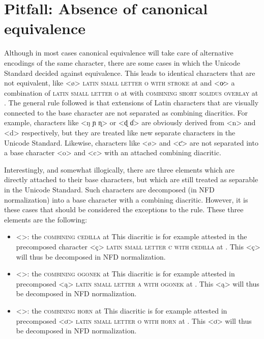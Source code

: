\section{Pitfall: Absence of canonical equivalence}
\label{pitfall-absence-of-equivalence}

Although in most cases canonical equivalence will take care of alternative
encodings of the same character, there are some cases in which the Unicode
Standard decided against equivalence. This leads to identical characters that
are not equivalent, like <ø> \textsc{latin small letter o with stroke} at
 and <o̷> a combination of \textsc{latin small letter o} at 
with \textsc{combining short solidus overlay} at .
The general rule followed is that extensions of Latin characters that are
visually connected to the base character are not separated as combining diacritics. For
example, characters like <ŋ ɲ ɳ> or <ɖ ɗ> are obviously derived from <n> and <d>
respectively, but they are treated like new separate characters in the Unicode
Standard. Likewise, characters like <ø> and <ƈ> are not separated into a base 
character <o> and <c> with an attached combining diacritic.

Interestingly, and somewhat illogically, there are three elements which are
directly attached to their base characters, but which are still treated as
separable in the Unicode Standard. Such characters are decomposed (in NFD
normalization) into a base character with a combining diacritic. However, it is
these cases that should be considered the exceptions to the rule. These three 
elements are the following:

\begin{itemize}

  \item <>: the \textsc{combining cedilla} at  \newline 
        This diacritic is
        for example attested in the precomposed character <ç> \textsc{latin
        small letter c with cedilla} at . This <ç> will thus be
        decomposed in NFD normalization.
  \item <>: the \textsc{combining ogonek} at  \newline 
        This diacritic is
        for example attested in precomposed <ą> \textsc{latin small letter a
        with ogonek} at . This <ą> will thus be decomposed in NFD
        normalization.
  \item <>: the \textsc{combining horn} at  \newline 
        This diacritic is for
        example attested in precomposed <ơ> \textsc{latin small letter o with
        horn} at . This <ơ> will thus be decomposed in NFD
        normalization. 

\end{itemize}

